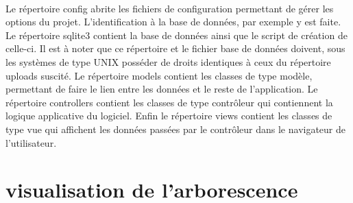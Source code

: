     \paragraph{}
        Le répertoire config abrite les fichiers de configuration permettant de
        gérer les options du projet.
        L'identification à la base de données, par exemple y est faite.
        Le répertoire sqlite3 contient la base de données ainsi que le script de
        création de celle-ci.
        Il est à noter que ce répertoire et le fichier base de données 
        doivent, sous les systèmes de type UNIX posséder de droits identiques 
        à ceux du répertoire uploads suscité.
        Le répertoire models contient les classes de type modèle, permettant
        de faire le lien entre les données et le reste de l'application.
        Le répertoire controllers contient les classes de type contrôleur qui
        contiennent la logique applicative du logiciel.
        Enfin le répertoire views contient les classes de type vue qui
        affichent les données passées par le contrôleur dans le navigateur de
        l'utilisateur.


\pagebreak
\section{visualisation de l'arborescence}
